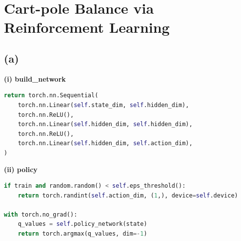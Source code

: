 \section{Cart-pole Balance via Reinforcement Learning}

\subsection*{(a)}

\textbf{(i) build\_network}
\begin{lstlisting}[language=Python]
return torch.nn.Sequential(
    torch.nn.Linear(self.state_dim, self.hidden_dim),
    torch.nn.ReLU(),
    torch.nn.Linear(self.hidden_dim, self.hidden_dim),
    torch.nn.ReLU(),
    torch.nn.Linear(self.hidden_dim, self.action_dim),
)
\end{lstlisting}

\textbf{(ii) policy}
\begin{lstlisting}[language=Python]
if train and random.random() < self.eps_threshold():
    return torch.randint(self.action_dim, (1,), device=self.device)

with torch.no_grad():
    q_values = self.policy_network(state)
    return torch.argmax(q_values, dim=-1)
\end{lstlisting}


